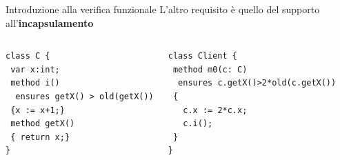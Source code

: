 \documentclass[]{beamer}
\begin{document}
\begin{frame}[containsverbatim]{Introduzione alla verifica funzionale}
L'altro requisito è quello del supporto all'\textbf{incapsulamento}
\begin{columns}[onlytextwidth]
    \column{0.5\pagewidth}
    \begin{center}
         \begin{lstlisting}
class C {
 var x:int;
 method i()
  ensures getX() > old(getX())
 {x := x+1;}
 method getX()
 { return x;}
}
        \end{lstlisting}
\end{center}
    \column{0.5\pagewidth}
    \begin{center}
        \begin{lstlisting}
class Client {
 method m0(c: C)
  ensures c.getX()>2*old(c.getX())
 {
   c.x := 2*c.x;
   c.i();
 }
}
\end{lstlisting}
\end{center}
\end{columns}
\end{frame}
\end{document}
